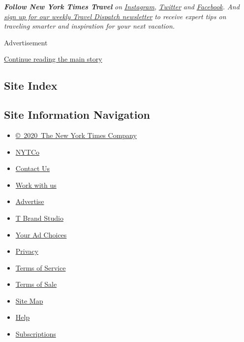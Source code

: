 \emph{\textbf{Follow New York Times Travel}} \emph{on}
\href{https://www.instagram.com/nytimestravel/}{\emph{Instagram}}\emph{,}
\href{https://twitter.com/nytimestravel}{\emph{Twitter}} \emph{and}
\href{https://www.facebookcorewwwi.onion/nytimestravel/}{\emph{Facebook}}\emph{.
And}
\href{https://www.nytimes3xbfgragh.onion/newsletters/traveldispatch}{\emph{sign
up for our weekly Travel Dispatch newsletter}} \emph{to receive expert
tips on traveling smarter and inspiration for your next vacation.}

Advertisement

\protect\hyperlink{after-bottom}{Continue reading the main story}

\hypertarget{site-index}{%
\subsection{Site Index}\label{site-index}}

\hypertarget{site-information-navigation}{%
\subsection{Site Information
Navigation}\label{site-information-navigation}}

\begin{itemize}
\tightlist
\item
  \href{https://help.nytimes3xbfgragh.onion/hc/en-us/articles/115014792127-Copyright-notice}{©~2020~The
  New York Times Company}
\end{itemize}

\begin{itemize}
\tightlist
\item
  \href{https://www.nytco.com/}{NYTCo}
\item
  \href{https://help.nytimes3xbfgragh.onion/hc/en-us/articles/115015385887-Contact-Us}{Contact
  Us}
\item
  \href{https://www.nytco.com/careers/}{Work with us}
\item
  \href{https://nytmediakit.com/}{Advertise}
\item
  \href{http://www.tbrandstudio.com/}{T Brand Studio}
\item
  \href{https://www.nytimes3xbfgragh.onion/privacy/cookie-policy\#how-do-i-manage-trackers}{Your
  Ad Choices}
\item
  \href{https://www.nytimes3xbfgragh.onion/privacy}{Privacy}
\item
  \href{https://help.nytimes3xbfgragh.onion/hc/en-us/articles/115014893428-Terms-of-service}{Terms
  of Service}
\item
  \href{https://help.nytimes3xbfgragh.onion/hc/en-us/articles/115014893968-Terms-of-sale}{Terms
  of Sale}
\item
  \href{https://spiderbites.nytimes3xbfgragh.onion}{Site Map}
\item
  \href{https://help.nytimes3xbfgragh.onion/hc/en-us}{Help}
\item
  \href{https://www.nytimes3xbfgragh.onion/subscription?campaignId=37WXW}{Subscriptions}
\end{itemize}

